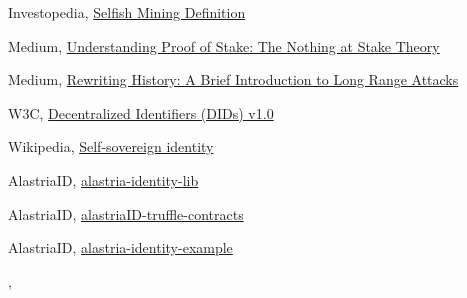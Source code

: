 \documentclass[target=mst,aauheader=]{thud}
\begin{document}
\begin{thebibliography}{99}
    Investopedia, \href{https://www.investopedia.com/terms/s/selfish-mining.asp}{Selfish Mining Definition}

    Medium, \href{https://medium.com/coinmonks/understanding-proof-of-stake-the-nothing-at-stake-theory-1f0d71bc027}{Understanding Proof of Stake: The Nothing at Stake Theory}

    Medium, \href{https://blog.positive.com/rewriting-history-a-brief-introduction-to-long-range-attacks-54e473acdba9}{Rewriting History: A Brief Introduction to Long Range Attacks}

    W3C, \href{https://w3c.github.io/did-core/}{Decentralized Identifiers (DIDs) v1.0}

    Wikipedia, \href{https://en.wikipedia.org/wiki/Self-sovereign_identity}{Self-sovereign identity}
    
    AlastriaID, \href{https://github.com/alastria/alastria-identity-lib}{alastria-identity-lib}

    AlastriaID, \href{https://github.com/alastria/alastriaID-truffle-contracts}{alastriaID-truffle-contracts}

    AlastriaID, \href{https://github.com/alastria/alastria-identity-example}{alastria-identity-example}

    \bibitem{}
    , \href{}{}

\end{thebibliography}

\end{document}
